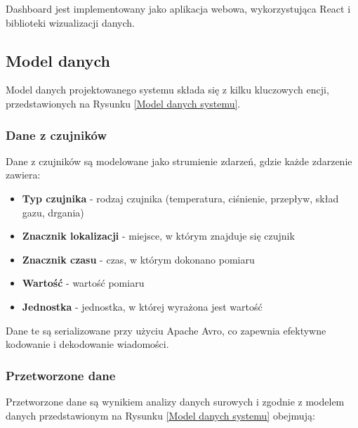 Dashboard jest implementowany jako aplikacja webowa, wykorzystująca React i biblioteki wizualizacji danych.

\subsection{Model danych}
\label{subsec:model_danych}

Model danych projektowanego systemu składa się z kilku kluczowych encji, przedstawionych na Rysunku \ref{Model danych systemu}.


\subsubsection{Dane z czujników}
\label{subsubsec:dane_czujnikow}

Dane z czujników są modelowane jako strumienie zdarzeń, gdzie każde zdarzenie zawiera:

\begin{itemize}
    \item \textbf{Typ czujnika} - rodzaj czujnika (temperatura, ciśnienie, przepływ, skład gazu, drgania)
    \item \textbf{Znacznik lokalizacji} - miejsce, w którym znajduje się czujnik
    \item \textbf{Znacznik czasu} - czas, w którym dokonano pomiaru
    \item \textbf{Wartość} - wartość pomiaru
    \item \textbf{Jednostka} - jednostka, w której wyrażona jest wartość
\end{itemize}

Dane te są serializowane przy użyciu Apache Avro, co zapewnia efektywne kodowanie i dekodowanie wiadomości.

\subsubsection{Przetworzone dane}
\label{subsubsec:przetworzone_dane}

Przetworzone dane są wynikiem analizy danych surowych i zgodnie z modelem danych przedstawionym na Rysunku \ref{Model danych systemu} obejmują:

